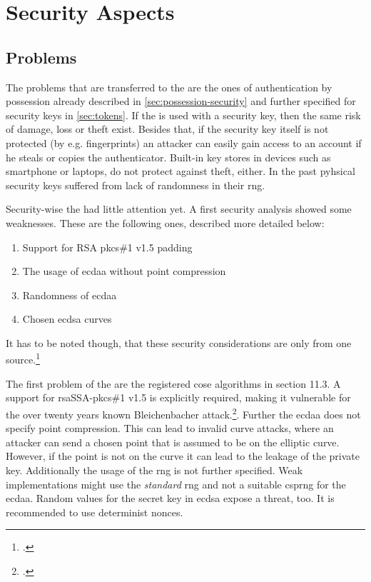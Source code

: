 \section{Security Aspects}


\subsection{Problems}

The problems that are transferred to the \wa{} are the ones of authentication by possession already described in \autoref{sec:possession-security} and further specified for security keys in \autoref{sec:tokens}. If the \wa{} is used with a security key, then the same risk of damage, loss or theft exist. Besides that, if the security key itself is not protected (by e.g. fingerprints) an attacker can easily gain access to an account if he steals or copies the authenticator. Built-in key stores in devices such as smartphone or laptops, do not protect against theft, either. In the past pyhsical security keys suffered from lack of randomness in their \gls{rng}.

Security-wise the \wa{} had little attention yet. A first security analysis showed some weaknesses. These are the following ones, described more detailed below:

\begin{enumerate}
	\item Support for RSA \gls{pkcs}\#1 v1.5 padding
	\item The usage of \gls{ecdaa} without point compression
	\item Randomness of \gls{ecdaa}
	\item Chosen \gls{ecdsa} curves
\end{enumerate}

It has to be noted though, that these security considerations are only from one source.\footcite[See][]{paragon-webauth}

The first problem of the \wa{} are the registered \gls{cose} algorithms in section 11.3. A support for \gls{rsa}SSA-\gls{pkcs}\#1 v1.5 is explicitly required, making it vulnerable for the over twenty years known \frqq Bleichenbacher attack\flqq.\footcites[See][]{10.1007/BFb0055716}. Further the \gls{ecdaa} does not specify point compression. This can lead to invalid curve attacks, where an attacker can send a chosen point that is assumed to be on the elliptic curve. However, if the point is not on the curve it can lead to the leakage of the private key. Additionally the usage of the \gls{rng} is not further specified. Weak implementations might use the \textit{standard} \gls{rng} and not a suitable \gls{csprng} for the \gls{ecdaa}. Random values for the secret key in \gls{ecdsa} expose a threat, too. It is recommended to use determinist \glspl{nonce}.

